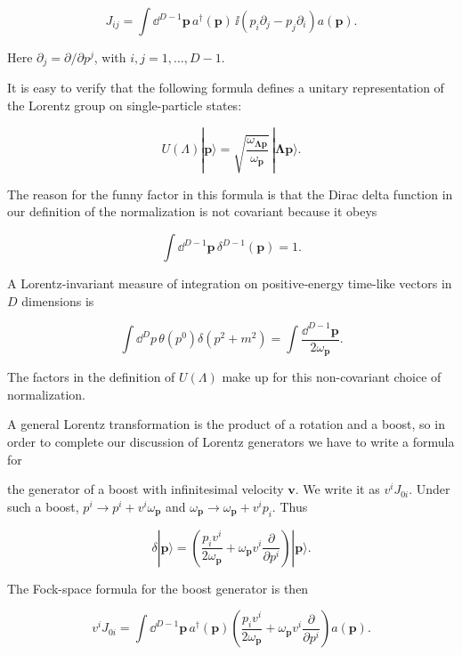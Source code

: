 \begin{equation}
J_{ij}=\int\dd^{D-1}\mathbf p\,a^\dagger(\mathbf p)\,\ii(p_i\partial_j-p_j\partial_i)a(\mathbf p).
\label{eq:2.5}
\end{equation}

Here $\partial_j=\partial/\partial p^j$, with $i,j=1,\ldots,D-1$.

It is easy to verify that the following formula defines a unitary representation of the
Lorentz group on single-particle states:

\[
U(\Lambda)|\mathbf p\rangle=\sqrt{\frac{\omega_{\boldsymbol{\Lambda p}}}{\omega_{\mathbf p}}}\,|\boldsymbol{\Lambda p}\rangle.
\]

The reason for the funny factor in this formula is that the Dirac delta function in our
definition of the normalization is not covariant because it obeys

\[
\int\dd^{D-1}\mathbf p\,\delta^{D-1}(\mathbf p)=1.
\]

A Lorentz-invariant measure of integration on positive-energy time-like vectors in $D$ dimensions is

\[
\int\dd^D p\,\theta(p^0)\delta(p^2+m^2)=\int\frac{\dd^{D-1}\mathbf p}{2\omega_{\mathbf p}}.
\]

The factors in the definition of $U(\Lambda)$ make up for this non-covariant choice of
normalization.

A general Lorentz transformation is the product of a rotation and a boost, so in
order to complete our discussion of Lorentz generators we have to write a formula for

the generator of a boost with infinitesimal velocity $\mathbf v$. We write it as $v^iJ_{0i}$. Under such
a boost, $p^i\to p^i+v^i\omega_{\mathbf p}$ and $\omega_{\mathbf p}\to\omega_{\mathbf p}+v^ip_i$. Thus

\[
\delta|\mathbf p\rangle=\left(\frac{p_iv^i}{2\omega_{\mathbf p}}+\omega_{\mathbf p}v^i\frac{\partial}{\partial p^i}\right)|\mathbf p\rangle.
\]

The Fock-space formula for the boost generator is then

\[
v^iJ_{0i}=\int\dd^{D-1}\mathbf p\,a^\dagger(\mathbf p)\left(\frac{p_iv^i}{2\omega_{\mathbf p}}+\omega_{\mathbf p}v^i\frac{\partial}{\partial p^i}\right)a(\mathbf p).
\]

